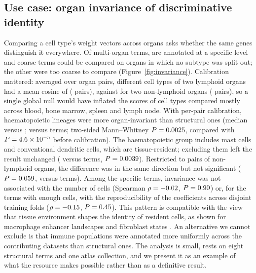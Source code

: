 \documentclass[11pt]{article}
\begin{document}
\subsection{Use case: organ invariance of discriminative identity}

Comparing a cell type's weight vectors across organs asks whether the same genes distinguish it everywhere. Of \nMultiOrganTerms{} multi-organ terms, \invTierOne{} are annotated at a specific level and \invTierTwo{} coarse terms could be compared on organs in which no subtype was split out; the other \invNExcluded{} were too coarse to compare (Figure~\ref{fig:invariance}). Calibration mattered: averaged over organ pairs, different cell types of two lymphoid organs had a mean cosine of \invNullLL{} (\invNPairsLL{} pairs), against \invNullPP{} for two non-lymphoid organs (\invNPairsPP{} pairs), so a single global null would have inflated the scores of cell types compared mostly across blood, bone marrow, spleen and lymph node. With per-pair calibration, haematopoietic lineages were more organ-invariant than structural ones (median \invCalCirc{} versus \invCalRes{}; \invNCirc{} versus \invNRes{} terms; two-sided Mann--Whitney $P = 0.0025{}$, compared with $P = 4.6\times10^{-5}{}$ before calibration). The haematopoietic group includes mast cells and conventional dendritic cells, which are tissue-resident; excluding them left the result unchanged (\invSensNHaem{} versus \invNRes{} terms, $P = 0.0039{}$). Restricted to pairs of non-lymphoid organs, the difference was in the same direction but not significant ($P = 0.059{}$, \invPerNCirc{} versus \invNRes{} terms). Among the \invTierOne{} specific terms, invariance was not associated with the number of cells (Spearman $\rho = -0.02{}$, $P = 0.90{}$) or, for the \invNStab{} terms with enough cells, with the reproducibility of the coefficients across disjoint training folds ($\rho = -0.15{}$, $P = 0.45{}$). This pattern is compatible with the view that tissue environment shapes the identity of resident cells, as shown for macrophage enhancer landscapes \cite{lavin2014} and fibroblast states \cite{buechler2021}. An alternative we cannot exclude is that immune populations were annotated more uniformly across the contributing datasets than structural ones. The analysis is small, rests on eight structural terms and one atlas collection, and we present it as an example of what the resource makes possible rather than as a definitive result.
\end{document}
